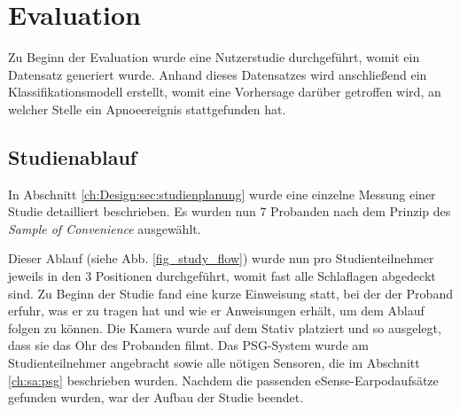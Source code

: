 
\chapter{Evaluation}
\label{ch:Evaluation}

Zu Beginn der Evaluation wurde eine Nutzerstudie durchgeführt, womit ein Datensatz generiert wurde. 
Anhand dieses Datensatzes wird anschließend ein Klassifikationsmodell erstellt, womit eine Vorhersage darüber getroffen wird, an welcher Stelle ein Apnoeereignis stattgefunden hat.

\section{Studienablauf}
In Abschnitt \ref{ch:Design:sec:studienplanung} wurde eine einzelne Messung einer Studie detailliert beschrieben.
Es wurden nun 7 Probanden nach dem Prinzip des \textit{Sample of Convenience} ausgewählt.

Dieser Ablauf (siehe Abb. \ref{fig_study_flow}) wurde nun pro Studienteilnehmer jeweils in den 3 Positionen durchgeführt, womit fast alle Schlaflagen abgedeckt sind.
Zu Beginn der Studie fand eine kurze Einweisung statt, bei der der Proband erfuhr, was er zu tragen hat und wie er Anweisungen erhält, um dem Ablauf folgen zu können. 
Die Kamera wurde auf dem Stativ platziert und so ausgelegt, dass sie das Ohr des Probanden filmt. 
Das PSG-System wurde am Studienteilnehmer angebracht sowie alle nötigen Sensoren, die im Abschnitt \ref{ch:sa:psg} beschrieben wurden.
Nachdem die passenden eSense-Earpodaufsätze gefunden wurden, war der Aufbau der Studie beendet.

